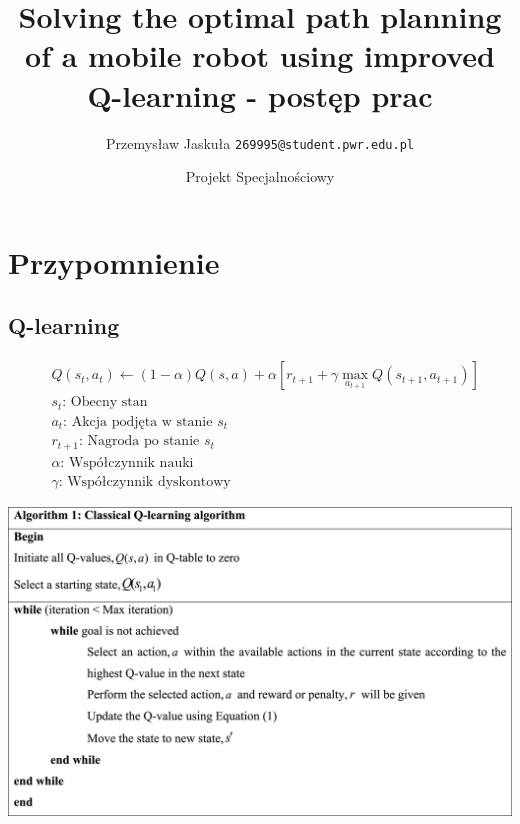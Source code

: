 \documentclass[aspectratio=169,15pt,]{beamer}
\title{Solving the optimal path planning of a mobile robot using improved Q-learning - postęp prac}
\institute{WYDZIAŁ ELEKTRONIKI, FOTONIKI I MIKROSYSTEMÓW}
\date{Projekt Specjalnościowy}
\author[Euclid]{Przemysław Jaskuła \texttt{269995@student.pwr.edu.pl}}
\begin{document}
\begin{frame}[plain]
\titlepage
\end{frame}
\begin{frame}
\tableofcontents
\end{frame}
\section{Przypomnienie}
\begin{frame}
	\sectionpage
\end{frame}
\subsection{Q-learning}
\begin{frame}
	\subsectionpage
\end{frame}
\begin{frame}
	\centering
	\begin{align*}
	&Q(s_t,a_t) \leftarrow (1-\alpha)Q(s,a)+\alpha \left[ r_{t+1} +\gamma \max_{a_{t+1}} Q(s_{t+1},a_{t+1})\right ] \\
	&s_t  \text{: Obecny stan}\\
	&a_t \text{: Akcja podjęta w stanie }s_t\\
	&r_{t+1} \text{: Nagroda po stanie }s_t\\
	&\alpha \text{: Współczynnik nauki}\\
	& \gamma \text{: Współczynnik dyskontowy}
	\end{align*}
\end{frame}
\begin{frame}
\includegraphics[width =\textwidth]{Obrazy/Pseudo.jpg}
\end{frame}
\end{document}
